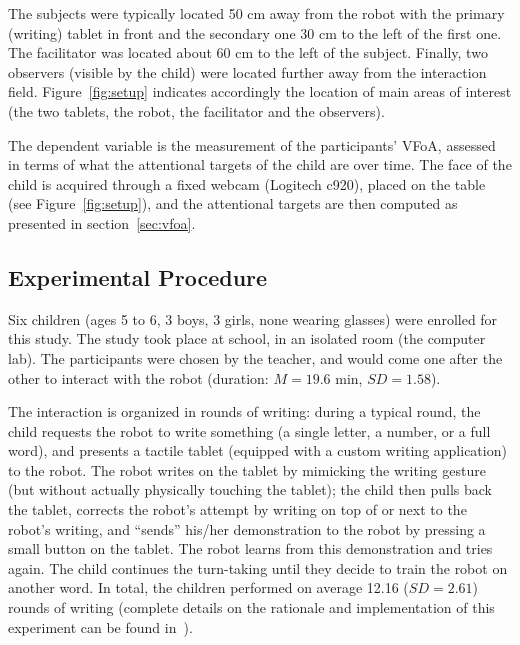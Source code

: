 \documentclass{sig-alternate}
\begin{document}
The subjects were typically located 50 cm away from the robot with the primary
(writing) tablet in front and the secondary one 30 cm to the left of the first
one.  The facilitator was located about 60 cm to the left of the subject.
Finally, two observers (visible by the child) were located further away from the
interaction field.  Figure~\ref{fig:setup} indicates accordingly the location of
main areas of interest (the two tablets, the robot, the facilitator and the
observers).


The dependent variable is the measurement of the participants' VFoA, assessed in
terms of what the attentional targets of the child are over time. The face of
the child is acquired through a fixed webcam (Logitech {\sf c920}), placed on
the table (see Figure~\ref{fig:setup}), and the attentional targets are then
computed as presented in section~\ref{sec:vfoa}.


\subsection{Experimental Procedure}

Six children (ages 5 to 6, 3 boys, 3 girls, none wearing glasses) were enrolled
for this study.  The study took place at school, in an isolated room (the
computer lab). The participants were chosen by the teacher, and would come one
after the other to interact with the robot (duration: $M=19.6$ min, $SD=1.58$).

The interaction is organized in rounds of writing: during a typical round, the
child requests the robot to write something (a single letter, a number, or a
full word), and presents a tactile tablet (equipped with a custom writing
application) to the robot. The robot writes on the tablet by mimicking the
writing gesture (but without actually physically touching the tablet); the child
then pulls back the tablet, corrects the robot's attempt by writing on top of or
next to the robot's writing, and ``sends'' his/her demonstration to the robot by
pressing a small button on the tablet. The robot learns from this demonstration
and tries again. The child continues the turn-taking until they decide to train
the robot on another word. In total, the children performed on average 12.16
($SD=2.61$) rounds of writing (complete details on the rationale and
implementation of this experiment can be found in~\cite{Hood:2015}).
\end{document}
